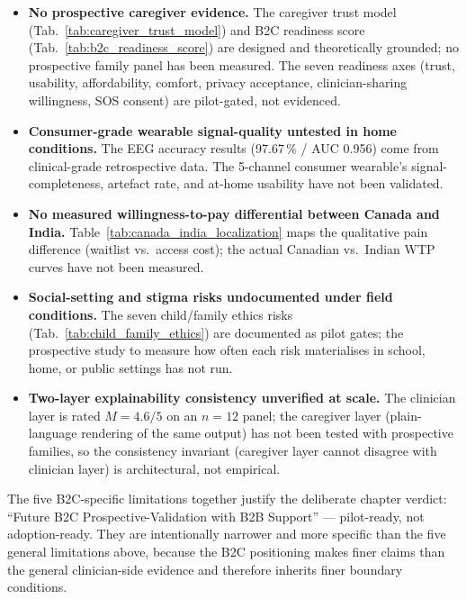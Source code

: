 \begin{itemize}[leftmargin=*, itemsep=2pt]
    \item \textbf{No prospective caregiver evidence.} The caregiver trust model (Tab.~\ref{tab:caregiver_trust_model}) and B2C readiness score (Tab.~\ref{tab:b2c_readiness_score}) are designed and theoretically grounded; no prospective family panel has been measured. The seven readiness axes (trust, usability, affordability, comfort, privacy acceptance, clinician-sharing willingness, SOS consent) are pilot-gated, not evidenced.
    \item \textbf{Consumer-grade wearable signal-quality untested in home conditions.} The EEG accuracy results (97.67\,\% / AUC 0.956) come from clinical-grade retrospective data. The 5-channel consumer wearable's signal-completeness, artefact rate, and at-home usability have not been validated.
    \item \textbf{No measured willingness-to-pay differential between Canada and India.} Table~\ref{tab:canada_india_localization} maps the qualitative pain difference (waitlist vs.\ access cost); the actual Canadian vs.\ Indian WTP curves have not been measured.
    \item \textbf{Social-setting and stigma risks undocumented under field conditions.} The seven child/family ethics risks (Tab.~\ref{tab:child_family_ethics}) are documented as pilot gates; the prospective study to measure how often each risk materialises in school, home, or public settings has not run.
    \item \textbf{Two-layer explainability consistency unverified at scale.} The clinician layer is rated $M = 4.6/5$ on an $n = 12$ panel; the caregiver layer (plain-language rendering of the same output) has not been tested with prospective families, so the consistency invariant (caregiver layer cannot disagree with clinician layer) is architectural, not empirical.
\end{itemize}

\noindent The five B2C-specific limitations together justify the deliberate chapter verdict: ``Future B2C Prospective-Validation with B2B Support'' --- pilot-ready, not adoption-ready. They are intentionally narrower and more specific than the five general limitations above, because the B2C positioning makes finer claims than the general clinician-side evidence and therefore inherits finer boundary conditions.


